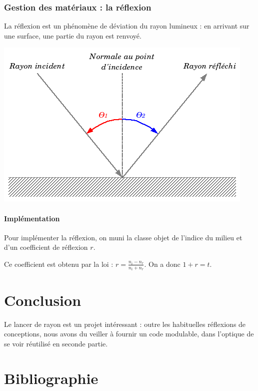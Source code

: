 \documentclass{article}
\begin{document}
\subsubsection{Gestion des matériaux : la réflexion}
La réflexion est un phénomène de déviation du rayon lumineux : en arrivant
sur une surface, une partie du rayon est renvoyé.

\begin{center}
  \includegraphics[scale=0.5]{img/reflexion.png}
\end{center}

\paragraph{Implémentation}
Pour implémenter la réflexion, on muni la classe objet de l'indice du milieu et
d'un coefficient de réflexion $r$.

Ce coefficient est obtenu par la loi : $r= \frac{n_i - n_r}{n_i + n_r}$. On a
donc $1+r=t$.

\section{Conclusion}
Le lancer de rayon est un projet intéressant : outre les habituelles réflexions
de conceptions, nous avons du veiller à fournir un code modulable, dans 
l'optique de se voir réutilisé en seconde partie.


\appendix
\section{Bibliographie}
\end{document}
